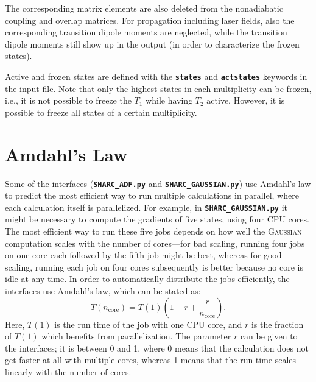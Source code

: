 \documentclass[a4paper,10pt,DIV=15,openany,twoside=false]{scrbook}
\newcommand{\ttt}[1]{\textbf{\texttt{#1}}}
\begin{document}
The corresponding matrix elements are also deleted from the nonadiabatic coupling and overlap matrices. For propagation including laser fields, also the corresponding transition dipole moments are neglected, while the transition dipole moments still show up in the output (in order to characterize the frozen states).

Active and frozen states are defined with the \ttt{states} and \ttt{actstates} keywords in the input file. Note that only the highest states in each multiplicity can be frozen, i.e., it is not possible to freeze the $T_1$ while having $T_2$ active. However, it is possible to freeze all states of a certain multiplicity.


\section{Amdahl's Law}\label{met:amdahl}

Some of the interfaces (\ttt{SHARC\_ADF.py} and \ttt{SHARC\_GAUSSIAN.py}) use Amdahl's law to predict the most efficient way to run multiple calculations in parallel, where each calculation itself is parallelized.
For example, in \ttt{SHARC\_GAUSSIAN.py} it might be necessary to compute the gradients of five states, using four CPU cores.
The most efficient way to run these five jobs depends on how well the \textsc{Gaussian} computation scales with the number of cores---for bad scaling, running four jobs on one core each followed by the fifth job might be best, whereas for good scaling, running each job on four cores subsequently is better because no core is idle at any time.
In order to automatically distribute the jobs efficiently, the interfaces use Amdahl's law, which can be stated as:
\begin{equation}
  T(n_\text{core})
  =
  T(1)
  \left(
    1-r+\frac{r}{n_\text{core}}
  \right).
\end{equation}
Here, $T(1)$ is the run time of the job with one CPU core, and $r$ is the fraction of $T(1)$ which benefits from parallelization.
The parameter $r$ can be given to the interfaces; it is between 0 and 1, where 0 means that the calculation does not get faster at all with multiple cores, whereas 1 means that the run time scales linearly with the number of cores.

\end{document}
